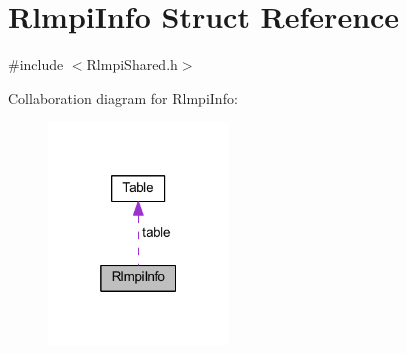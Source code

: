 \hypertarget{structRlmpiInfo}{}\section{Rlmpi\+Info Struct Reference}
\label{structRlmpiInfo}


{\ttfamily \#include $<$Rlmpi\+Shared.\+h$>$}



Collaboration diagram for Rlmpi\+Info\+:
\nopagebreak
\begin{figure}[H]
\begin{center}
\leavevmode
\includegraphics[width=136pt]{structRlmpiInfo__coll__graph}
\end{center}
\end{figure}
